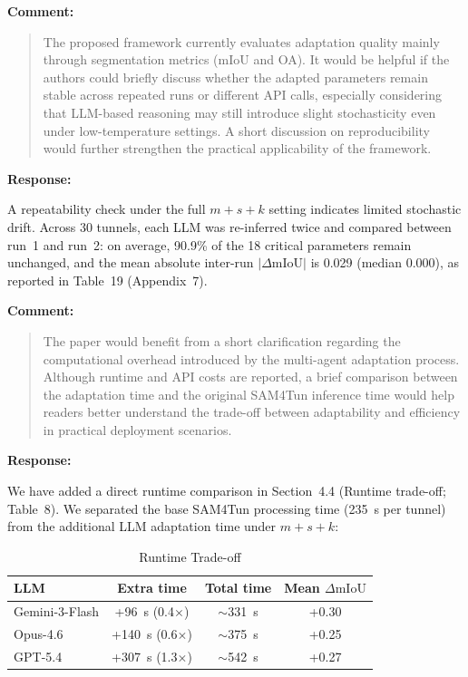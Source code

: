 \documentclass[11pt,a4paper]{article}
\newcommand{\MSRuntimeTable}{Table~8}
\newcommand{\MSAppendixRepeatability}{Appendix~7}
\newenvironment{commentblock}{%
  \par\smallskip\noindent\textbf{Comment:}\par
  \begin{quote}\itshape\color{black}
}{%
  \end{quote}\smallskip
}
\newenvironment{responseblock}{%
  \par\smallskip\noindent\textbf{Response:}\par
  \begingroup\color{responsegreen}
}{%
  \endgroup\smallskip
}
\begin{document}
\begin{commentblock}
The proposed framework currently evaluates adaptation quality mainly through segmentation metrics (mIoU and OA). It would be helpful if the authors could briefly discuss whether the adapted parameters remain stable across repeated runs or different API calls, especially considering that LLM-based reasoning may still introduce slight stochasticity even under low-temperature settings. A short discussion on reproducibility would further strengthen the practical applicability of the framework.
\end{commentblock}
\begin{responseblock}
A repeatability check under the full $m+s+k$ setting indicates limited stochastic drift. Across 30 tunnels, each LLM was re-inferred twice and compared between run~1 and run~2: on average, 90.9\% of the 18 critical parameters remain unchanged, and the mean absolute inter-run $|\Delta\text{mIoU}|$ is 0.029 (median 0.000), as reported in Table~19 (\MSAppendixRepeatability).
\end{responseblock}

\begin{commentblock}
The paper would benefit from a short clarification regarding the computational overhead introduced by the multi-agent adaptation process. Although runtime and API costs are reported, a brief comparison between the adaptation time and the original SAM4Tun inference time would help readers better understand the trade-off between adaptability and efficiency in practical deployment scenarios.
\end{commentblock}
\begin{responseblock}
We have added a direct runtime comparison in Section~4.4 (Runtime trade-off; \MSRuntimeTable). We separated the base SAM4Tun processing time (235~s per tunnel) from the additional LLM adaptation time under $m+s+k$:

{%
\begin{table}[H]
  \centering
  \small
  \caption{Runtime Trade-off}
  \label{tab:runtime-tradeoff}
  \begingroup\color{responsegreen}
  \begin{tabular}{@{}lccc@{}}
    \toprule
    LLM & Extra time & Total time & Mean $\Delta\text{mIoU}$ \\
    \midrule
    Gemini-3-Flash & +96~s (0.4$\times$)  & $\sim$331~s & +0.30 \\
    Opus-4.6       & +140~s (0.6$\times$) & $\sim$375~s & +0.25 \\
    GPT-5.4        & +307~s (1.3$\times$) & $\sim$542~s & +0.27 \\
    \bottomrule
  \end{tabular}
  \endgroup
\end{table}
}%
\end{responseblock}
\end{document}

